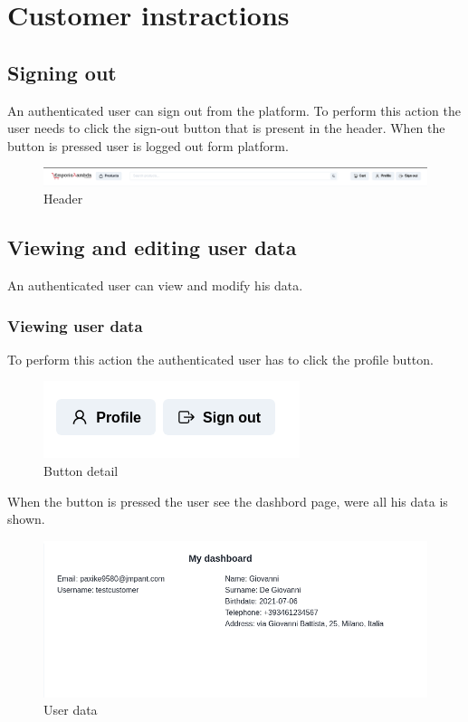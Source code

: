 \section{Customer instractions}
\subsection{Signing out}
An authenticated user can sign out from the platform. To perform this action the user needs to click the sign-out button that is present in the header. When the button is pressed user is logged out form platform.
\begin{figure}[!ht]
    \caption{Header}
    \vspace{10px}
    \includegraphics[scale=0.25]{../../../../Images/userManual/signOut.jpg}
    \centering
\end{figure}
\subsection{Viewing and editing user data}
An authenticated user can view and modify his data.
\subsubsection{Viewing user data}
To perform this action the authenticated user has to click the profile button.
\begin{figure}[!ht]
    \caption{Button detail}
    \vspace{10px}
    \includegraphics[scale=0.5]{../../../../Images/userManual/profile-signoutButton.png}
    \centering
\end{figure}
When the button is pressed the user see the dashbord page, were all his data is shown.
\begin{figure}[!ht]
    \caption{User data}
    \vspace{10px}
    \includegraphics[scale=0.5]{../../../../Images/userManual/profileDshboard.png}
    \centering
\end{figure}
\newpage
